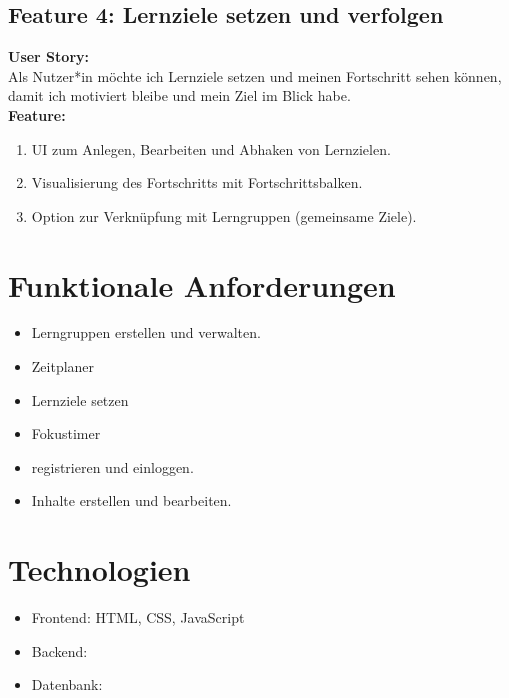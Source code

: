 \documentclass[12pt,a4paper]{article}
\begin{document}
\subsection{Feature 4: Lernziele setzen und verfolgen}

\textbf{User Story:}\\
Als Nutzer*in möchte ich Lernziele setzen und meinen Fortschritt sehen können, damit ich motiviert bleibe und mein Ziel im Blick habe.\\[1em]

\textbf{Feature:}
\begin{enumerate}
  \item UI zum Anlegen, Bearbeiten und Abhaken von Lernzielen.
  \item Visualisierung des Fortschritts mit Fortschrittsbalken.
  \item Option zur Verknüpfung mit Lerngruppen (gemeinsame Ziele).
\end{enumerate}

\section{Funktionale Anforderungen}
\begin{itemize}
  \item Lerngruppen erstellen und verwalten.
  \item Zeitplaner
  \item Lernziele setzen
  \item  Fokustimer
  \item registrieren und einloggen.
  \item Inhalte erstellen und bearbeiten.
\end{itemize}

\section{Technologien}
\begin{itemize}
  \item Frontend: HTML, CSS, JavaScript
  \item Backend: 
  \item Datenbank: 
\end{itemize}
\end{document}
